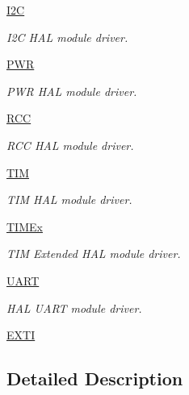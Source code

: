 \begin{DoxyCompactItemize}
\hyperlink{group__I2C}{I2C}
\begin{DoxyCompactList}\small\item\em I2C H\+AL module driver. \end{DoxyCompactList}\item 
\hyperlink{group__PWR}{P\+WR}
\begin{DoxyCompactList}\small\item\em P\+WR H\+AL module driver. \end{DoxyCompactList}\item 
\hyperlink{group__RCC}{R\+CC}
\begin{DoxyCompactList}\small\item\em R\+CC H\+AL module driver. \end{DoxyCompactList}\item 
\hyperlink{group__TIM}{T\+IM}
\begin{DoxyCompactList}\small\item\em T\+IM H\+AL module driver. \end{DoxyCompactList}\item 
\hyperlink{group__TIMEx}{T\+I\+M\+Ex}
\begin{DoxyCompactList}\small\item\em T\+IM Extended H\+AL module driver. \end{DoxyCompactList}\item 
\hyperlink{group__UART}{U\+A\+RT}
\begin{DoxyCompactList}\small\item\em H\+AL U\+A\+RT module driver. \end{DoxyCompactList}\item 
\hyperlink{group__EXTI}{E\+X\+TI}
\end{DoxyCompactItemize}


\subsection{Detailed Description}
